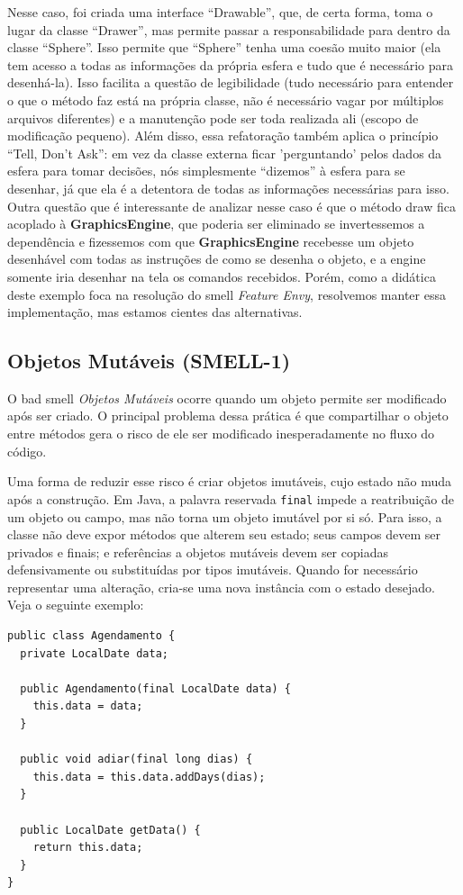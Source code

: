 \documentclass[12pt,a4paper]{article}
\newcommand{\smell}[1]{\textit{#1}}
\begin{document}
Nesse caso, foi criada uma interface “Drawable”, que, de certa forma, toma o lugar da classe “Drawer”, mas permite passar a responsabilidade para dentro da classe “Sphere”. Isso permite que “Sphere” tenha uma coesão muito maior (ela tem acesso a todas as informações da própria esfera e tudo que é necessário para desenhá-la). Isso facilita a questão de legibilidade (tudo necessário para entender o que o método faz está na própria classe, não é necessário vagar por múltiplos arquivos diferentes) e a manutenção pode ser toda realizada ali (escopo de modificação pequeno). Além disso, essa refatoração também aplica o princípio “Tell, Don't Ask”: em vez da classe externa ficar 'perguntando' pelos dados da esfera para tomar decisões, nós simplesmente “dizemos” à esfera para se desenhar, já que ela é a detentora de todas as informações necessárias para isso. Outra questão que é interessante de analizar nesse caso é que o método draw fica acoplado à \textbf{GraphicsEngine}, que poderia ser eliminado se invertessemos a dependência e fizessemos com que \textbf{GraphicsEngine} recebesse um objeto desenhável com todas as instruções de como se desenha o objeto, e a engine somente iria desenhar na tela os comandos recebidos. Porém, como a didática deste exemplo foca na resolução do smell \smell{Feature Envy}, resolvemos manter essa implementação, mas estamos cientes das alternativas.


\subsection{Objetos Mutáveis (SMELL-1)}

O bad smell \smell{Objetos Mutáveis} ocorre quando um objeto permite ser modificado após ser criado. O principal problema dessa prática é que compartilhar o objeto entre métodos gera o risco de ele ser modificado inesperadamente no fluxo do código.

Uma forma de reduzir esse risco é criar objetos imutáveis, cujo estado não muda após a construção. Em Java, a palavra reservada \texttt{final} impede a reatribuição de um objeto ou campo, mas não torna um objeto imutável por si só. Para isso, a classe não deve expor métodos que alterem seu estado; seus campos devem ser privados e finais; e referências a objetos mutáveis devem ser copiadas defensivamente ou substituídas por tipos imutáveis. Quando for necessário representar uma alteração, cria-se uma nova instância com o estado desejado. Veja o seguinte exemplo:

\begin{lstlisting}[caption={Antes: objeto mutável compartilhado},label={lst:mutable-before}]
public class Agendamento {
  private LocalDate data;

  public Agendamento(final LocalDate data) {
    this.data = data;
  }

  public void adiar(final long dias) {
    this.data = this.data.addDays(dias);
  }

  public LocalDate getData() {
    return this.data;
  }
}
\end{lstlisting}
\end{document}

